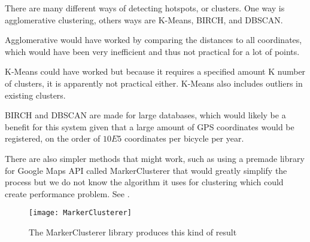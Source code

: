 There are many different ways of detecting hotspots, or clusters. One way is agglomerative clustering, others ways are K-Means, BIRCH, and DBSCAN.

Agglomerative would have worked by comparing the distances to all coordinates, which would have been very inefficient and thus not practical for a lot of points. 

K-Means could have worked but because it requires a specified amount K number of clusters, it is apparently not practical either. K-Means also includes outliers in existing clusters.

BIRCH and DBSCAN are made for large databases, which would likely be a benefit for this system given that a large amount of GPS coordinates would be registered, on the order of $10E5$ coordinates per bicycle per year. 

There are also simpler methods that might work, such as using a premade library for Google Maps API called MarkerClusterer that would greatly simplify the process but we do not know the algorithm it uses for clustering which could create performance problem. See .

\begin{figure}[h]
\begin{center}
\texttt{[image: MarkerClusterer]}
\caption{The MarkerClusterer library produces this kind of result}
\label{fig:markerclusterer}
\end{center}
\end{figure}




 


